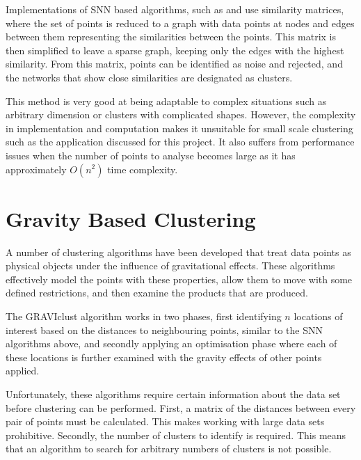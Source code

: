 Implementations of SNN based algorithms, such as \cite{jarvis1973clustering}
and \cite{ertoz2002new} use similarity matrices, where the set of points is
reduced to a graph with data points at nodes and edges between them
representing the similarities between the points. This matrix is then
simplified to leave a sparse graph, keeping only the edges with the highest
similarity. From this matrix, points can be identified as noise and rejected,
and the networks that show close similarities are designated as clusters.

This method is very good at being adaptable to complex situations such as
arbitrary dimension or clusters with complicated shapes. However, the
complexity in implementation and computation makes it unsuitable for small
scale clustering such as the application discussed for this project. It also
suffers from performance issues when the number of points to analyse becomes
large as it has approximately $O(n^2)$ time complexity.

\section{Gravity Based Clustering}
\label{sub:gravity_based_clustering}

A number of clustering algorithms \cite{zhong2010novel} have been developed
that treat data points as physical objects under the influence of gravitational
effects. These algorithms effectively model the points with these properties,
allow them to move with some defined restrictions, and then examine the
products that are produced.

The GRAVIclust algorithm \cite{indulska2002gravity} works in two phases, first
identifying $n$ locations of interest based on the distances to neighbouring
points, similar to the SNN algorithms above, and secondly applying an
optimisation phase where each of these locations is further examined with the
gravity effects of other points applied.

Unfortunately, these algorithms require certain information about the data set
before clustering can be performed. First, a matrix of the distances between
every pair of points must be calculated. This makes working with large data
sets prohibitive. Secondly, the number of clusters to identify is required.
This means that an algorithm to search for arbitrary numbers of clusters is not
possible.
